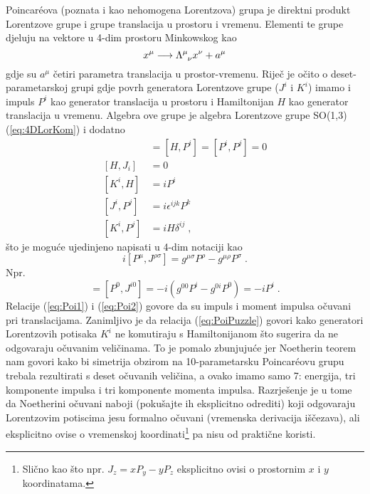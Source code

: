 Poincar\'{e}ova (poznata i kao nehomogena Lorentzova) grupa je
direktni produkt Lorentzove grupe i grupe translacija u prostoru
i vremenu. Elementi te grupe djeluju na vektore u 4-dim prostoru
Minkowskog kao
\begin{equation}
  x^\mu \longrightarrow \tensor{\Lambda}{^\mu_\nu} x^\nu + a^\mu
\label{eq:defPoin}
\end{equation}
gdje su $a^\mu$ četiri parametra translacija u prostor-vremenu.
Riječ je očito o deset-parametarskoj grupi gdje povrh generatora
Lorentzove grupe ($J^i$ i $K^i$) imamo i impuls $P^i$ kao
generator translacija u prostoru i Hamiltonijan $H$ kao
generator translacija u vremenu.
Algebra ove grupe je algebra Lorentzove grupe SO(1,3) (\ref{eq:4DLorKom}) 
i dodatno
\begin{align}
[H, H]& = [H, P^i] = [P^i, P^j] = 0 \label{eq:Poi1} \\
[H, J_i]& = 0  \label{eq:Poi2}\\
[K^i, H]& = i P^i  \label{eq:PoiPuzzle} \\
[J^i, P^j]& = i \epsilon^{ijk} P^k \\
[K^i, P^j]& = i H \delta^{ij} \;,
\label{eq:PoinKom}
\end{align}
što je moguće ujedinjeno napisati u 4-dim notaciji kao
\begin{equation}
i [P^\mu, J^{\rho\sigma}] = g^{\mu\sigma}P^\rho - g^{\mu\rho}P^{\sigma} \;.
\label{eq:4DPoinKom}
\end{equation}
Npr.
\begin{displaymath}
[H, K^i] = [P^0, J^{i0}] = -i(g^{0 0}P^i - g^{0i}P^0) =  -i P^i \;.
\end{displaymath}
Relacije  (\ref{eq:Poi1}) i (\ref{eq:Poi2}) govore da su impuls i
moment impulsa očuvani pri translacijama. Zanimljivo je da relacija
(\ref{eq:PoiPuzzle}) govori kako generatori Lorentzovih potisaka
$K^i$ ne komutiraju s Hamiltonijanom što sugerira da ne odgovaraju
očuvanim veličinama. To je pomalo zbunjujuće jer Noetherin teorem
nam govori kako bi simetrija obzirom na 10-parametarsku Poincar\'{e}ovu grupu
trebala rezultirati s deset očuvanih veličina, a ovako imamo samo
7: energija, tri komponente impulsa i tri komponente momenta impulsa.
Razrješenje je u tome da Noetherini očuvani naboji
(pokušajte ih eksplicitno odrediti) koji
odgovaraju Lorentzovim potiscima jesu formalno očuvani (vremenska
derivacija iščezava), ali eksplicitno ovise o vremenskoj 
koordinati\footnote{Slično kao što npr. $J_z = x P_y - y P_z$ 
eksplicitno ovisi o prostornim $x$ i $y$ koordinatama.}
pa nisu od praktične koristi. 

